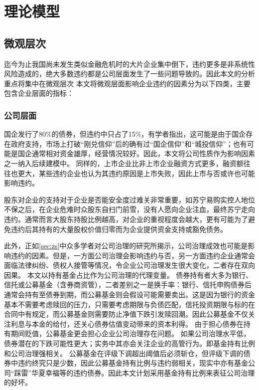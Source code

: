 
\chapter{理论模型}
\label{modelselection}
\section{微观层次}
迄今为止我国尚未发生类似金融危机时的大片企业集中倒下，违约更多是非系统性风险造成的，绝大多数违约都是公司层面发生了一些问题导致的。因此本文的分析重点将集中在微观层次
本文将微观层面影响企业违约的因素分为以下四类，主要包含企业层面的指标：
\subsection{公司层面}

国企发行了80\%的债券，但违约中只占了15\%，有学者指出，这可能是由于国企存在政府支持\cite{mo2021china}，市场上打破“刚兑信仰”后的确有过“国企信仰”和“城投信仰”；也有可能是国企通常相对资金雄厚，经营情况较好。因此，本文将公司性质作为影响因素之一纳入后续建模中。
同样的，上市企业比非上市企业融资方式更多，融资额往往也更大，某些违约企业也认为其违约原因是上市失败，因此上市与否或许也可能影响违约。

股东对企业的支持对于企业是否能安全度过难关非常重要，如苏宁易购实控人地位不保之后，在企业危难时众股东自扫门前雪，没有人愿向企业注血，最终苏宁走向违约。通常而言大股东持股比例越高，对企业的重视程度会越大，更有可能为了避免违约后其持有的大量股权价值归零而为企业提供资金支持或豁免债务。

此外，正如\ref{sec:zs}中众多学者对公司治理的研究所揭示，公司治理成效也可能是影响违约的因素。但是，一方面公司治理会影响违约与否，另一方面违约企业通常会面临法律纠纷、债权人接管等情况，令企业公司治理发生很大变化，二者存在双向因果。
本文以持有基金占比作为公司治理的代理变量。
债券持有者大多为银行、信托或公募基金（含券商资管），二者差别之一是换手率：银行、信托申购债券后通常会持有至债券到期，而公募基金则会假设可能需要卖出。这是因为银行的资金基本不需要考虑赎回的压力，只需要考虑期限与负债匹配，信托投资期限与标的在合同中有规定，而公募基金则需要防止净值下跌引发赎回潮。因此公募基金不仅关注利息与本金的给付，还关心债券估值变动带来的资本利得。
由于担心债券在持有期间贬值，公募基金更会担心企业公司治理存在问题。
如果公司治理水平低，债券潜在的下跌可能性更大\Parencite{anginer2018corporate}；实务中其亦会关注企业的高管行为。即基金持有比例和公司治理强相关。
公募基金在评级下调超出阈值后必须斩仓，但评级下调的债券中违约终究只是少数，因此公募基金持有比例与违约弱相关，现实中亦有基金公司“踩雷”华夏幸福等的违约债券。因此本文计划采用基金持有比例来表征公司治理的好坏。

